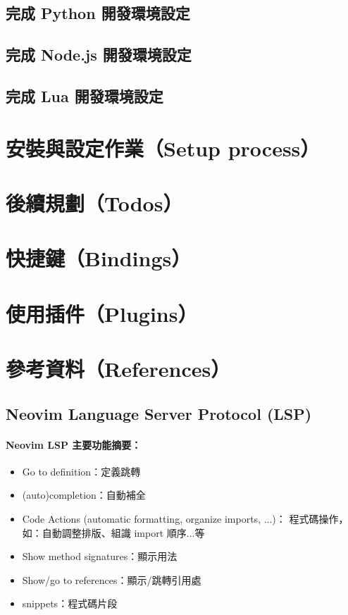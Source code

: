 \documentclass[]{article}
\begin{document}
\subsection{完成 Python 開發環境設定}

\subsection{完成 Node.js 開發環境設定}

\subsection{完成 Lua 開發環境設定}

\clearpage

\section{安裝與設定作業（Setup process）}
\clearpage

\section{後續規劃（Todos）}
\clearpage

\section{快捷鍵（Bindings）}
\clearpage

\section{使用插件（Plugins）}
\clearpage

\section{參考資料（References）}
\clearpage

\subsection{Neovim Language Server Protocol (LSP)}
\label{sec.lsp.intro}

\paragraph{Neovim LSP 主要功能摘要：}

\begin{itemize}
	\item Go to definition：定義跳轉
	\item (auto)completion：自動補全
	\item Code Actions (automatic formatting, organize imports, ...)： 程式碼操作，如：自動調整排版、組識 import 順序...等
	\item Show method signatures：顯示用法
	\item Show/go to references：顯示/跳轉引用處
	\item snippets：程式碼片段
\end{itemize}
\end{document}

